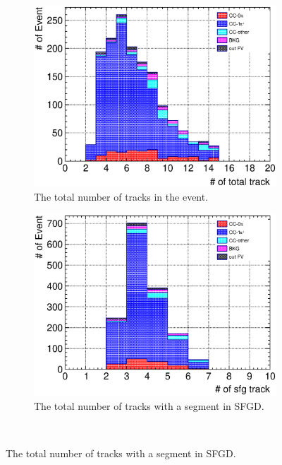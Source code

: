 \begin{figure}
  \centering
  \begin{subfigure}{\dbfigwid\textwidth}
       \includegraphics[width=\textwidth]{figures/sel/SFGmu_ntotaltrk_stack_al9.eps}
       \caption{The total number of tracks in the event.}
       \label{subfig:tlpi-trknum-tot-sfgmu-cut}
  \end{subfigure}
  \begin{subfigure}{\dbfigwid\textwidth}
       \includegraphics[width=\textwidth]{figures/sel/SFGmu_nsfgtrk_stack_al9.eps}
       \caption{The total number of tracks with a segment in SFGD.}
       \label{subfig:tlpi-trknum-sfgd-sfgmu-cut}
  \end{subfigure}
  \\

\end{figure}
